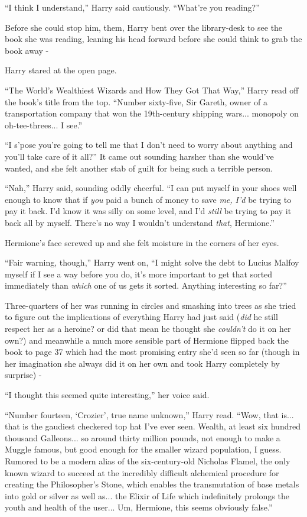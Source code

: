 ``I think I understand,'' Harry said cautiously. ``What're you reading?''

Before she could stop him, them, Harry bent over the library-desk to see the book she was reading, leaning his head forward before she could think to grab the book away -

Harry stared at the open page.

``The World's Wealthiest Wizards and How They Got That Way,'' Harry read off the book's title from the top. ``Number sixty-five, Sir Gareth, owner of a transportation company that won the 19th-century shipping wars... monopoly on oh-tee-threes... I see.''

``I s'pose you're going to tell me that I don't need to worry about anything and you'll take care of it all?'' It came out sounding harsher than she would've wanted, and she felt another stab of guilt for being such a terrible person.

``Nah,'' Harry said, sounding oddly cheerful. ``I can put myself in your shoes well enough to know that if \emph{you} paid a bunch of money to save \emph{me, I'd} be trying to pay it back. I'd know it was silly on some level, and I'd \emph{still} be trying to pay it back all by myself. There's no way I wouldn't understand \emph{that}, Hermione.''

Hermione's face screwed up and she felt moisture in the corners of her eyes.

``Fair warning, though,'' Harry went on, ``I might solve the debt to Lucius Malfoy myself if I see a way before you do, it's more important to get that sorted immediately than \emph{which} one of us gets it sorted. Anything interesting so far?''

Three-quarters of her was running in circles and smashing into trees as she tried to figure out the implications of everything Harry had just said (\emph{did} he still respect her as a heroine? or did that mean he thought she \emph{couldn't} do it on her own?) and meanwhile a much more sensible part of Hermione flipped back the book to page 37 which had the most promising entry she'd seen so far (though in her imagination she always did it on her own and took Harry completely by surprise) -

``I thought this seemed quite interesting,'' her voice said.

``Number fourteen, `Crozier', true name unknown,'' Harry read. ``Wow, that is... that is the gaudiest checkered top hat I've ever seen. Wealth, at least six hundred thousand Galleons... so around thirty million pounds, not enough to make a Muggle famous, but good enough for the smaller wizard population, I guess. Rumored to be a modern alias of the six-century-old Nicholas Flamel, the only known wizard to succeed at the incredibly difficult alchemical procedure for creating the Philosopher's Stone, which enables the transmutation of base metals into gold or silver as well as... the Elixir of Life which indefinitely prolongs the youth and health of the user... Um, Hermione, this seems obviously false.''

